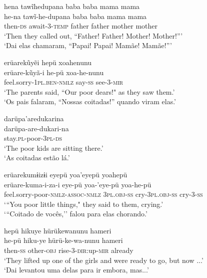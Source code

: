 \documentclass[output=paper,
modfonts,nonflat
]{langsci/langscibook}
\begin{document}
\ea   hena tawĩhedupana baba baba mama mama \\[.3em]
\gll 	he-na tawĩ-he-dupana baba baba mama mama\\
then-\textsc{ds} await-3-\textsc{temp} father father mother mother\\
\glt    `Then they called out, ``Father! Father! Mother! Mother!{''}' \\
`Dai elas chamaram, ``Papai! Papai! Mamãe! Mamãe!{''}'
\z

\largerpage
\ea   erüarekũyẽi hepü xoahenunu \\[.3em]
\gll 	erüare-kũyã-i he-pü xoa-he-nunu\\
feel.sorry-\textsc{1pl.ben-nmlz} say-\textsc{ss} see-\textsc{3-mir} \\
\glt    `The parents said, ``Our poor dears!" as they saw them.' \\
`Os pais falaram, ``Nossas coitadas!'' quando viram elas.' \\
\z


\ea    darüpa'aredukarina \\[.3em]
\gll 	darüpa-are-dukari-na\\
stay.\textsc{pl}-poor-\textsc{3pl-ds}\\
\glt    `The poor kids are sitting there.' \\
`As coitadas estão lá.'
\z

 
\ea     erüarekumɨizɨi eyepü yoa'eyepü yoahepü \\[.3em]
\gll 	erüare-kuma-i-za-i eye-pü yoa-'eye-pü yoa-he-pü\\
feel.sorry-poor-\textsc{nmlz-assoc-nmlz} \textsc{3pl.obj-ss} cry-\textsc{3pl.obj-ss} cry-\textsc{3-ss}\\
\glt   `{``}You poor little things," they said to them, crying.'  \\
`{``}Coitado de vocês,'' falou para elas chorando.'\\
\z

\ea   hepü hikuye hürükewanunu hameri \\[.3em]
\gll 	he-pü hiku-ye hürü-ke-wa-nunu hameri\\
then-\textsc{ss} other-\textsc{obj} rise-\textsc{3-dir:}up-\textsc{mir} already\\
\glt    `They lifted up one of the girls and were ready to go, but now ...' \\
`Dai levantou uma delas para ir embora, mas...'\\
\z
\end{document}
